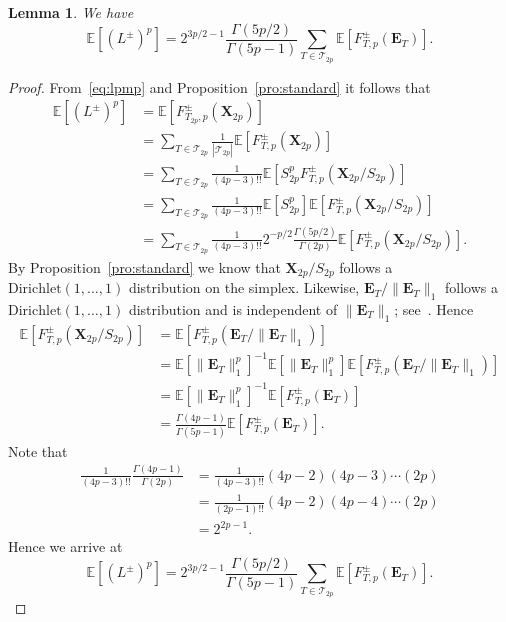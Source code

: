 \documentclass[english,11pt]{smfart}
\newcommand{\Ex}[1]{\mathbb{E}[#1]}
\newcommand{\Exb}[1]{\mathbb{E}\left[#1\right]}
\newcommand{\cT}{\mathcal{T}}
\newtheorem{lemma}[theorem]{Lemma}
\numberwithin{equation}{section}
\begin{document}
\begin{lemma}
	\label{le:expshift}
	We have
	\[
		\Ex{(L^\pm)^p} = 2^{3p/2-1}\frac{\Gamma(5p/2)}{\Gamma(5p-1)} \sum_{T\in\cT_{2p}} \Ex{F_{T,p}^\pm(\bm E_T)}.
	\]
\end{lemma}
\begin{proof}
	 From~\eqref{eq:lpmp} and Proposition~\ref{pro:standard} it follows that
	\begin{align*}
		\Ex{(L^\pm)^p} 	&= \Exb{ F_{T_{2p},p}^\pm(\bm{X}_{2p})} \\
		&= \sum_{T\in\cT_{2p}} \frac{1}{|\cT_{2p}|} \Exb{ F_{T,p}^\pm(\bm{X}_{2p})} \\
		&= \sum_{T\in\cT_{2p}} \frac{1}{(4p-3)!!} \Exb{ S_{2p}^{p} F_{T,p}^\pm(\bm{X}_{2p}/S_{2p})} \\
		&= \sum_{T \in \cT_{2p}} \frac{1}{(4p-3)!!} \Exb{ S_{2p}^{p} } \Exb{ F_{T,p}^\pm(\bm{X}_{2p}/S_{2p})} \\
		&= \sum_{T \in \cT_{2p}} \frac{1}{(4p-3)!!} 2^{-p/2} \frac{\Gamma(5p/2)}{\Gamma(2p)} \Exb{ F_{T,p}^\pm(\bm{X}_{2p}/S_{2p})}.
	\end{align*}
	By Proposition~\ref{pro:standard} we know that $\bm{X}_{2p}/S_{2p}$ follows a $\mathrm{Dirichlet}(1, \ldots, 1)$ distribution on the simplex. Likewise, \(\bm{E}_T / \|\bm{E}_T\|_1\) follows a
\(\mathrm{Dirichlet}(1,\ldots,1)\) distribution and is independent of
\(\|\bm{E}_T\|_1\); see~\cite[Thm. 4.1]{zbMATH03954145}. Hence
	\begin{align*}
		\Exb{ F_{T,p}^\pm(\bm{X}_{2p}/S_{2p})} &= \Exb{ F_{T,p}^\pm(\bm{E}_T / \|\bm{E}_T\|_1)} \\
		&= \Exb{\|\bm{E}_T\|_1^{p}}^{-1} \Exb{\|\bm{E}_T\|_1^{p}} \Exb{ F_{T,p}^\pm(\bm{E}_T / \|\bm{E}_T\|_1)} \\
		&= \Exb{\|\bm{E}_T\|_1^{p}}^{-1} \Exb{ F_{T,p}^\pm(\bm{E}_T )} \\
		&= \frac{\Gamma(4p-1)}{\Gamma(5p-1)} \Exb{ F_{T,p}^\pm(\bm{E}_T )}.
	\end{align*}
	Note that
	\begin{align*}
		\frac{1}{(4p-3)!!} \frac{\Gamma(4p-1)}{\Gamma(2p)} &= \frac{1}{(4p-3)!!} (4p-2) (4p-3) \cdots (2p) \\
		&= \frac{1}{ (2p-1)!!} (4p-2) (4p-4) \cdots (2p) \\
		&= 2^{2p-1}.
	\end{align*}
	Hence we arrive at
	\[
		\Ex{(L^\pm)^p} = 2^{3p/2-1}\frac{\Gamma(5p/2)}{\Gamma(5p-1)} \sum_{T\in\cT_{2p}} \Ex{F_{T,p}^\pm(\bm E_T)}.
	\]
\end{proof}
\end{document}
